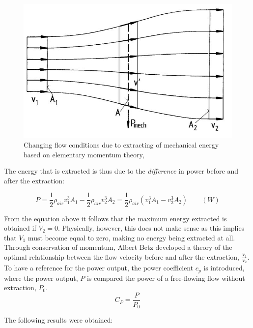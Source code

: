 \begin{figure}[H]
\centering
\includegraphics[scale=0.6]{figures/flow}
\caption[$\; \:$Changing flow conditions due to extracting of mechanical]{Changing flow conditions due to extracting of mechanical energy based on elementary momentum theory, \cite{Hau2013} }
 \label{fig:flow}
\end{figure}

\noindent The energy that is extracted is thus due to the \textit{difference} in power before and after the extraction: 

\begin{equation}
    P = \frac{1}{2}\rho_{air} v^3_1 A_1 - \frac{1}{2}\rho_{air} v^3_2 A_2 =\frac{1}{2}\rho_{air}( v^3_1 A_1 - v^3_2 A_2) \qquad (W)
\end{equation}

\noindent From the equation above it follows that the maximum energy extracted is obtained if $V_2=0$. Physically, however, this does not make sense as this implies that $V_1$ must become equal to zero, making no energy being extracted at all. Through conservation of momentum, Albert Betz developed a theory of the optimal relationship between the flow velocity before and after the extraction, $\frac{V_1}{V_2}$. To have a reference for the power output, the power coefficient $c_p$ is introduced, where the power output, $P$  is compared the power of a free-flowing flow without extraction, $P_0$. 
  \begin{equation}
    C_P = \frac{P}{P_0}
\end{equation}

\noindent The following results were obtained: 

